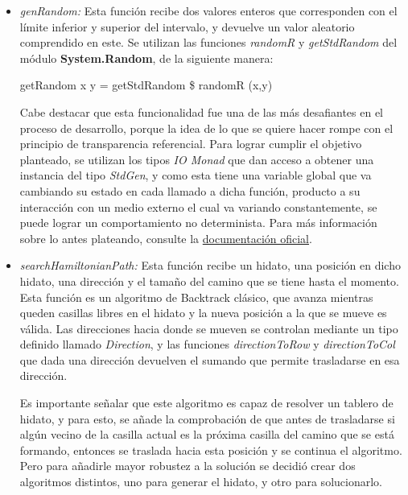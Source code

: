 \documentclass[10pt]{amsart}
\begin{document}
    \begin{itemize}

        \item \textit{genRandom:} Esta funci\'on recibe dos valores enteros que corresponden con el l\'imite inferior y superior del intervalo, y devuelve un valor aleatorio comprendido en este. Se utilizan las funciones \textit{randomR} y \textit{getStdRandom} del m\'odulo \textbf{System.Random}, de la siguiente manera:

        \begin{center}
                getRandom x y = getStdRandom \$ randomR (x,y)
        \end{center}

        Cabe destacar que esta funcionalidad fue una de las m\'as desafiantes en el proceso de desarrollo, porque la idea de lo que se quiere hacer rompe con el principio de transparencia referencial. Para lograr cumplir el objetivo planteado, se utilizan los tipos \textit{IO Monad}  que dan acceso a obtener una instancia del tipo \textit{StdGen}, y como esta tiene una variable global que va cambiando su estado en cada llamado a dicha funci\'on, producto a su interacci\'on con un medio externo el cual va variando constantemente, se puede lograr un comportamiento no determinista. Para m\'as informaci\'on sobre lo antes plateando, consulte la \href{https://hackage.haskell.org/package/random-1.2.1.1/docs/System-Random.html#g:5}{documentaci\'on oficial}.  

        \item \textit{searchHamiltonianPath:} Esta funci\'on recibe un hidato, una posici\'on en dicho hidato, una direcci\'on y el tama\~no del camino que se tiene hasta el momento. Esta funci\'on es un algoritmo de Backtrack cl\'asico, que avanza mientras queden casillas libres en el hidato y la nueva posici\'on a la que se mueve es v\'alida. Las direcciones hacia donde se mueven se controlan mediante un tipo definido llamado \textit{Direction}, y las funciones \textit{directionToRow} y \textit{directionToCol} que dada una direcci\'on devuelven el sumando que permite trasladarse en esa direcci\'on. 

        Es importante se\~nalar que este algoritmo es capaz de resolver un tablero de hidato, y para esto, se a\~nade la comprobaci\'on de que antes de trasladarse si alg\'un vecino de la casilla actual es la pr\'oxima casilla del camino que se est\'a formando, entonces se traslada hacia esta posici\'on y se continua el algoritmo. Pero para a\~nadirle mayor robustez a la soluci\'on se decidi\'o crear dos algoritmos distintos, uno para generar el hidato, y otro para solucionarlo.
                        

\end{itemize}
\end{document}
